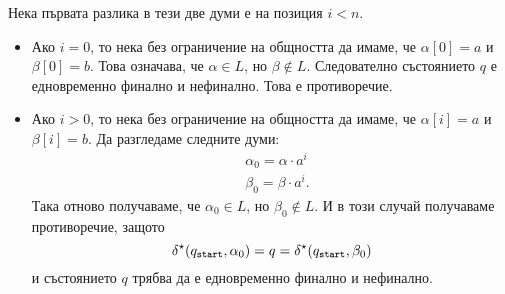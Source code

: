 \begin{hint}
  Нека първата разлика в тези две думи е на позиция $i < n$.
  \begin{itemize}
  \item
    Ако $i = 0$, то нека без ограничение на общността да имаме, че $\alpha[0] = a$ и $\beta[0] = b$.
    Това означава, че $\alpha \in L$, но $\beta \not\in L$.
    Следователно състоянието $q$ е едновременно финално и нефинално. Това е противоречие.
  \item
    Ако $i > 0$, то нека без ограничение на общността да имаме, че $\alpha[i] = a$ и $\beta[i] = b$.
    Да разгледаме следните думи:
    \begin{align*}
      & \alpha_0 = \alpha \cdot a^{i}\\
      & \beta_0 = \beta \cdot a^{i}.
    \end{align*}
    Така отново получаваме, че $\alpha_0 \in L$, но $\beta_0 \not\in L$.
    И в този случай получаваме противоречие, защото
    \[\delta^\star(q_{\texttt{start}},\alpha_0) = q = \delta^\star(q_{\texttt{start}},\beta_0)\]
    и състоянието $q$ трябва да е едновременно финално и нефинално.
  \end{itemize}  
\end{hint}

